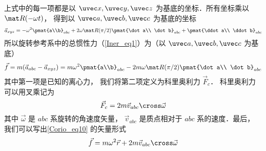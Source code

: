 上式中的每一项都是以 $\uvec x, \uvec y, \uvec z$ 为基底的坐标．所有坐标乘以 $\mat R(-\omega t)$， 得到以 $\uvec a, \uvec b, \uvec c$ 为基底的坐标
\begin{equation}
\vec a_{xyz} =
- \omega^2 \pmat{a\\b}_{abc} + 2\omega \mat R(\pi /2)\pmat{\dot a\\ \dot b}_{abc} + \pmat{\ddot a\\ \ddot b}_{abc}
\end{equation}
所以旋转参考系中的总惯性力（\autoref{Iner_eq1}）为（以 $\uvec a, \uvec b, \uvec c$ 为基底）
\begin{equation}\label{Corio_eq10}
\vec f = m(\vec a_{abc} - \vec a_{xyz})
=  m \omega ^2 \pmat{a\\b}_{abc} - 2m\omega \mat R(\pi /2)\pmat{\dot a\\ \dot b}_{abc}
\end{equation}
其中第一项是已知的离心力， 我们将第二项定义为科里奥利力 $\vec F_c$． 科里奥利力可以用叉乘记为
\begin{equation}
\vec F_c = 2m \vec v_{abc} \cross \vec \omega
\end{equation}
其中 $\vec\omega$ 是 $abc$ 系旋转的角速度矢量， $\vec v_{abc}$ 是质点相对于 $abc$ 系的速度．最后， 我们可以写出\autoref{Corio_eq10} 的矢量形式
\begin{equation}
\vec f = m \omega ^2 \vec r + 2m \vec v_{abc} \cross \vec \omega 
\end{equation}
 





